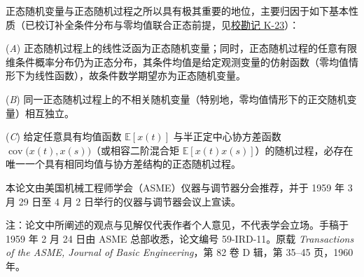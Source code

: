 正态随机变量与正态随机过程之所以具有极其重要的地位，主要归因于如下基本性质（已校订补全条件分布与零均值联合正态前提，见\hyperref[sec:k23]{校勘记 K-23}）：

\begin{theorem}\label{thm:5}

(\emph{A}) 正态随机过程上的线性泛函为正态随机变量；同时，正态随机过程的任意有限维条件概率分布仍为正态分布，其条件均值是给定观测变量的仿射函数（零均值情形下为线性函数），故条件数学期望亦为正态随机变量。

(\emph{B}) 同一正态随机过程上的不相关随机变量（特别地，零均值情形下的正交随机变量）相互独立。

(\emph{C}) 给定任意具有均值函数 $\mathbb{E}[x(t)]$ 与半正定中心协方差函数 $\operatorname{cov}\bigl(x(t), x(s)\bigr)$（或相容二阶混合矩 $\mathbb{E}[x(t)x(s)]$）的随机过程，必存在唯一一个具有相同均值与协方差结构的正态随机过程。

\end{theorem}

本论文由美国机械工程师学会（ASME）仪器与调节器分会推荐，并于 1959 年 3 月 29 日至 4 月 2 日举行的仪器与调节器会议上宣读。

注：论文中所阐述的观点与见解仅代表作者个人意见，不代表学会立场。手稿于 1959 年 2 月 24 日由 ASME 总部收悉，论文编号 59-IRD-11。原载 \emph{Transactions of the ASME, Journal of Basic Engineering}，第 82 卷 D 辑，第 35–45 页，1960 年。






